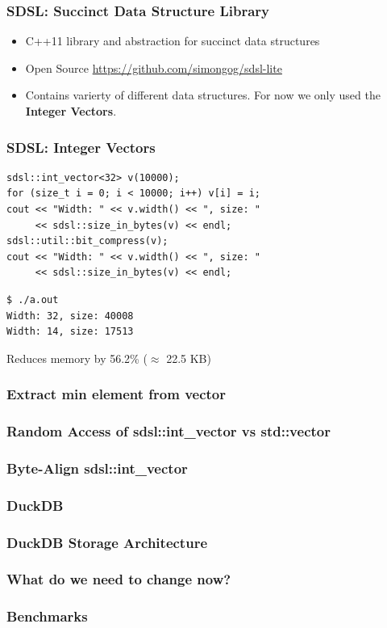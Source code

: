 \documentclass{beamer}
\begin{document}
\begin{frame}
    \frametitle{SDSL: Succinct Data Structure Library}

    \begin{itemize}
        \item C++11 library and abstraction for succinct data structures
        \item Open Source \url{https://github.com/simongog/sdsl-lite}
        \item Contains varierty of different data structures. For now we only used the \textbf{Integer Vectors}.
    \end{itemize}

\end{frame}

\begin{frame}[fragile]
    \frametitle{SDSL: Integer Vectors}

\begin{lstlisting}[style=C++]
sdsl::int_vector<32> v(10000);
for (size_t i = 0; i < 10000; i++) v[i] = i;
cout << "Width: " << v.width() << ", size: " 
     << sdsl::size_in_bytes(v) << endl;
sdsl::util::bit_compress(v);
cout << "Width: " << v.width() << ", size: " 
     << sdsl::size_in_bytes(v) << endl;
\end{lstlisting}

\pause

\begin{lstlisting}[style=shell]
$ ./a.out
Width: 32, size: 40008
Width: 14, size: 17513
\end{lstlisting}

\pause

\begin{center}
Reduces memory by 56.2\% ($\approx$ 22.5 KB)
\end{center}
\end{frame}

\begin{frame}
    \frametitle{Extract min element from vector}
\end{frame}

\begin{frame}
    \frametitle{Random Access of sdsl::int\_vector vs std::vector}
\end{frame}

\begin{frame}
    \frametitle{Byte-Align sdsl::int\_vector}
\end{frame}

\begin{frame}
    \frametitle{DuckDB}
\end{frame}

\begin{frame}
    \frametitle{DuckDB Storage Architecture}
\end{frame}

\begin{frame}
    \frametitle{What do we need to change now?}
\end{frame}

\begin{frame}
    \frametitle{Benchmarks}
\end{frame}
\end{document}
